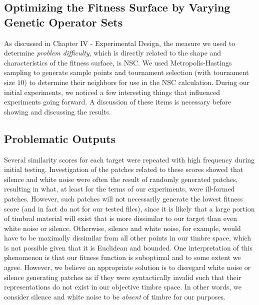 \documentclass[12pt]{report} 	%
\numberwithin{figure}{chapter}
\numberwithin{table}{chapter}
\numberwithin{equation}{chapter}
\begin{document}
\begin{flushleft}
\vspace{12pt}\section{Optimizing the Fitness Surface by Varying Genetic Operator Sets}
As discussed in Chapter IV - Experimental Design, the measure we used to determine \textit{problem difficulty}, which is directly related to the shape and characteristics of the fitness surface, is NSC. We used Metropolis-Hastings sampling to generate sample points and tournament selection (with tournament size $10$) to determine their neighbors for use in the NSC calculation. During our initial experiments, we noticed a few interesting things that influenced experiments going forward. A discussion of these items is necessary before showing and discussing the results.

\vspace{12pt}
\subsection{Problematic Outputs}
Several similarity scores for each target were repeated with high frequency during initial testing. Investigation of the patches related to these scores showed that silence and white noise were often the result of randomly generated patches, resulting in what, at least for the terms of our experiments, were ill-formed patches. However, such patches will not necessarily generate the lowest fitness score (and in fact do not for our tested files), since it is likely that a large portion of timbral material will exist that is more dissimilar to our target than even white noise or silence. Otherwise, silence and white noise, for example, would have to be maximally dissimilar from all other points in our timbre space, which is not possible given that it is Euclidean and bounded. One interpretation of this phenomenon is that our fitness function is suboptimal and to some extent we agree. However, we believe an appropriate solution is to disregard white noise or silence generating patches as if they were syntactically invalid such that their representations do not exist in our objective timbre space. In other words, we consider silence and white noise to be \textit{absent} of timbre for our purposes.


\end{flushleft}
\end{document}
